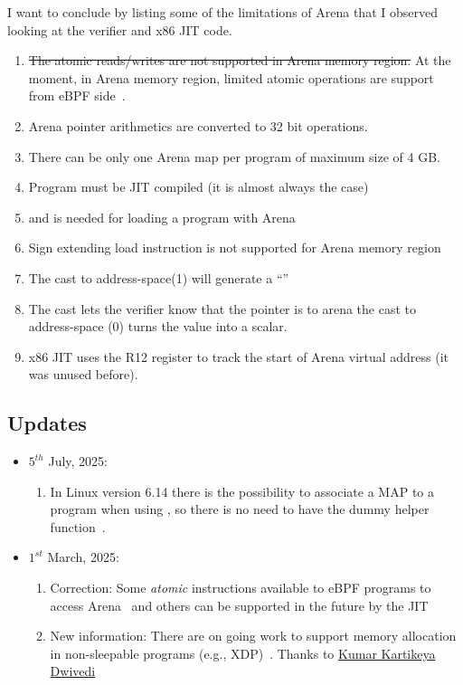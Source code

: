 \documentclass{article} \usepackage{graphicx}
\begin{document}
I want to conclude by listing some of the limitations of Arena that I observed
looking at the verifier and x86 JIT code.

\begin{enumerate}
  \item \sout{The atomic reads/writes are not supported in Arena memory region.} At the moment, in Arena memory region, limited atomic operations are support from eBPF side~\cite{arena_atomic}.
\item Arena pointer arithmetics are converted to 32 bit operations.
\item There can be only one Arena map per program of maximum size of 4 GB.
\item Program must be JIT compiled (it is almost always the case)
\item {} and  is needed for loading a program with Arena
\item Sign extending load instruction is not supported for Arena memory region
\item The cast to address-space(1) will generate a ``''
\item The cast lets the verifier know that the pointer is to arena
        the cast to address-space (0) turns the value into a scalar.
\item x86 JIT uses the R12 register to track the start of Arena virtual
    address (it was unused before).
\end{enumerate}

\subsection{Updates}
\begin{itemize}
  \item $5^{th}$ July, 2025:
    \begin{enumerate}
      \item In Linux version 6.14 there is the possibility to associate a MAP to a program when using , so there is no need to have the dummy helper function~\cite{associate_map_with_bpf}.
    \end{enumerate}
  \item $1^{st}$ March, 2025:
    \begin{enumerate}
      \item Correction: Some \emph{atomic} instructions available to eBPF programs to access Arena~\cite{arena_atomic} and others can be supported in the future by the JIT
      \item New information: There are on going work to support memory allocation in non-sleepable programs (e.g., XDP)~\cite{slub,try_alloc}. Thanks to \href{https://kkdwivedi.in/}{Kumar Kartikeya Dwivedi}
    \end{enumerate}
\end{itemize}



\end{document}
